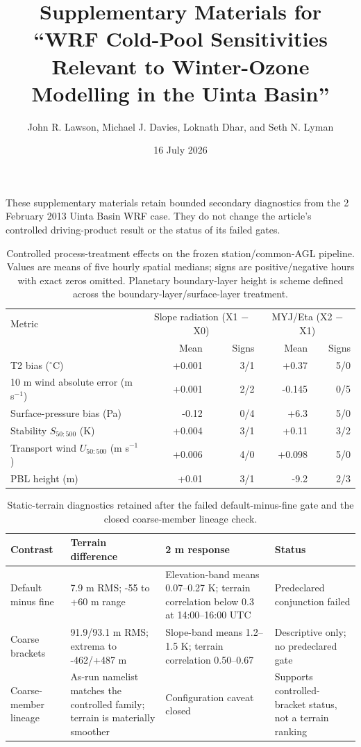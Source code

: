 \documentclass[a4paper,11pt]{article}
\title{Supplementary Materials for ``WRF Cold-Pool Sensitivities Relevant to Winter-Ozone Modelling in the Uinta Basin''}
\author{John R. Lawson, Michael J. Davies, Loknath Dhar, and Seth N. Lyman}
\date{16 July 2026}
\begin{document}
\maketitle

These supplementary materials retain bounded secondary diagnostics from the 2 February 2013 Uinta Basin WRF case.
They do not change the article's controlled driving-product result or the status of its failed gates.

\begin{table}[H]
\caption{Controlled process-treatment effects on the frozen station/common-AGL pipeline.
Values are means of five hourly spatial medians; signs are positive/negative hours with exact zeros omitted.
Planetary boundary-layer height is scheme defined across the boundary-layer/surface-layer treatment.}
\label{tab:s1-process-effects}
\centering
\footnotesize
\begin{tabular}{lrrrr}
\toprule
Metric & \multicolumn{2}{c}{Slope radiation (X1 $-$ X0)} & \multicolumn{2}{c}{MYJ/Eta (X2 $-$ X1)} \\
 & Mean & Signs & Mean & Signs \\
\midrule
T2 bias ($^{\circ}$C) & +0.001 & 3/1 & +0.37 & 5/0 \\
10 m wind absolute error (m s$^{-1}$) & +0.001 & 2/2 & -0.145 & 0/5 \\
Surface-pressure bias (Pa) & -0.12 & 0/4 & +6.3 & 5/0 \\
Stability $S_{50:500}$ (K) & +0.004 & 3/1 & +0.11 & 3/2 \\
Transport wind $U_{50:500}$ (m s$^{-1}$) & +0.006 & 4/0 & +0.098 & 5/0 \\
PBL height (m) & +0.01 & 3/1 & -9.2 & 2/3 \\
\bottomrule
\end{tabular}
\end{table}

\begin{table}[H]
\caption{Static-terrain diagnostics retained after the failed default-minus-fine gate and the closed coarse-member lineage check.}
\label{tab:s2-terrain-summary}
\centering
\small
\begin{tabularx}{\textwidth}{lXXX}
\toprule
Contrast & Terrain difference & 2 m response & Status \\
\midrule
Default minus fine & 7.9 m RMS; -55 to +60 m range & Elevation-band means 0.07--0.27 K; terrain correlation below 0.3 at 14:00--16:00 UTC & Predeclared conjunction failed \\
Coarse brackets & 91.9/93.1 m RMS; extrema to -462/+487 m & Slope-band means 1.2--1.5 K; terrain correlation 0.50--0.67 & Descriptive only; no predeclared gate \\
Coarse-member lineage & As-run namelist matches the controlled family; terrain is materially smoother & Configuration caveat closed & Supports controlled-bracket status, not a terrain ranking \\
\bottomrule
\end{tabularx}
\end{table}
\end{document}
